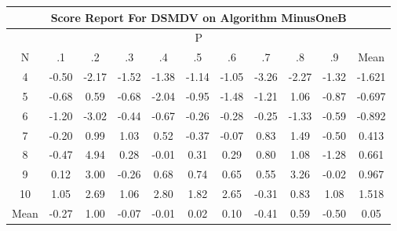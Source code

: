 \documentclass[11pt,a4paper]{report}
\begin{document}
\begin{longtable}{ | c || c | c | c | c | c | c | c | c | c || c |}
\hline
\multicolumn{11}{|c|}{ Score Report For DSMDV on Algorithm MinusOneB} \\
\hline
\multicolumn{11}{|c|}{ P } \\
\hline
N & .1 & .2 & .3 & .4 & .5 & .6 & .7 & .8 & .9 & Mean\\
 \hline
 \hline
 \endhead
  4 &  \cellcolor[HTML]{FFEFEF} -0.50 &  \cellcolor[HTML]{FFC7C7} -2.17 &  \cellcolor[HTML]{FFD7D7} -1.52 &  \cellcolor[HTML]{FFDFDF} -1.38 &  \cellcolor[HTML]{FFDFDF} -1.14 &  \cellcolor[HTML]{FFE7E7} -1.05 &  \cellcolor[HTML]{FFAFAF} -3.26 &  \cellcolor[HTML]{FFC7C7} -2.27 &  \cellcolor[HTML]{FFDFDF} -1.32 & -1.621 \\
  5 &  \cellcolor[HTML]{FFEFEF} -0.68 &  \cellcolor[HTML]{EFEFFF} 0.59 &  \cellcolor[HTML]{FFEFEF} -0.68 &  \cellcolor[HTML]{FFCFCF} -2.04 &  \cellcolor[HTML]{FFE7E7} -0.95 &  \cellcolor[HTML]{FFD7D7} -1.48 &  \cellcolor[HTML]{FFDFDF} -1.21 &  \cellcolor[HTML]{E7E7FF} 1.06 &  \cellcolor[HTML]{FFE7E7} -0.87 & -0.697 \\
  6 &  \cellcolor[HTML]{FFDFDF} -1.20 &  \cellcolor[HTML]{FFAFAF} -3.02 &  \cellcolor[HTML]{FFF7F7} -0.44 &  \cellcolor[HTML]{FFEFEF} -0.67 &  \cellcolor[HTML]{FFF7F7} -0.26 &  \cellcolor[HTML]{FFF7F7} -0.28 &  \cellcolor[HTML]{FFF7F7} -0.25 &  \cellcolor[HTML]{FFDFDF} -1.33 &  \cellcolor[HTML]{FFEFEF} -0.59 & -0.892 \\
  7 &  \cellcolor[HTML]{FFF7F7} -0.20 &  \cellcolor[HTML]{E7E7FF} 0.99 &  \cellcolor[HTML]{E7E7FF} 1.03 &  \cellcolor[HTML]{EFEFFF} 0.52 &  \cellcolor[HTML]{FFF7F7} -0.37 &  \cellcolor[HTML]{FFFFFF} -0.07 &  \cellcolor[HTML]{E7E7FF} 0.83 &  \cellcolor[HTML]{D7D7FF} 1.49 &  \cellcolor[HTML]{FFEFEF} -0.50 & 0.413 \\
  8 &  \cellcolor[HTML]{FFF7F7} -0.47 &  \cellcolor[HTML]{8080FF} 4.94 &  \cellcolor[HTML]{F7F7FF} 0.28 &  \cellcolor[HTML]{FFFFFF} -0.01 &  \cellcolor[HTML]{F7F7FF} 0.31 &  \cellcolor[HTML]{F7F7FF} 0.29 &  \cellcolor[HTML]{E7E7FF} 0.80 &  \cellcolor[HTML]{E7E7FF} 1.08 &  \cellcolor[HTML]{FFDFDF} -1.28 & 0.661 \\
  9 &  \cellcolor[HTML]{FFFFFF} 0.12 &  \cellcolor[HTML]{B7B7FF} 3.00 &  \cellcolor[HTML]{FFF7F7} -0.26 &  \cellcolor[HTML]{EFEFFF} 0.68 &  \cellcolor[HTML]{EFEFFF} 0.74 &  \cellcolor[HTML]{EFEFFF} 0.65 &  \cellcolor[HTML]{EFEFFF} 0.55 &  \cellcolor[HTML]{AFAFFF} 3.26 &  \cellcolor[HTML]{FFFFFF} -0.02 & 0.967 \\
  10 &  \cellcolor[HTML]{E7E7FF} 1.05 &  \cellcolor[HTML]{BFBFFF} 2.69 &  \cellcolor[HTML]{E7E7FF} 1.06 &  \cellcolor[HTML]{B7B7FF} 2.80 &  \cellcolor[HTML]{CFCFFF} 1.82 &  \cellcolor[HTML]{BFBFFF} 2.65 &  \cellcolor[HTML]{FFF7F7} -0.31 &  \cellcolor[HTML]{E7E7FF} 0.83 &  \cellcolor[HTML]{E7E7FF} 1.08 & 1.518 \\
 \hline
 \hline
Mean &  \cellcolor[HTML]{FFF7F7} -0.27 &  \cellcolor[HTML]{E7E7FF} 1.00 &  \cellcolor[HTML]{FFFFFF} -0.07 &  \cellcolor[HTML]{FFFFFF} -0.01 &  \cellcolor[HTML]{FFFFFF} 0.02 &  \cellcolor[HTML]{FFFFFF} 0.10 &  \cellcolor[HTML]{FFF7F7} -0.41 &  \cellcolor[HTML]{EFEFFF} 0.59 &  \cellcolor[HTML]{FFEFEF} -0.50 &  \cellcolor[HTML]{FFFFFF} 0.05
\end{longtable}
\end{document}
